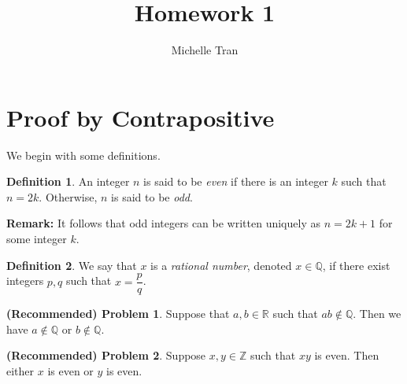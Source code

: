 \documentclass[a4paper,11pt]{article}
\author{Michelle Tran}
\title{Homework 1}
\begin{document}
\maketitle

\newtheorem{prop}{Proposition}[section]
\newtheorem{thm}{Theorem}[section]
\newtheorem{lemma}{Lemma}[section]
\newtheorem{cor}{Corollary}[prop]

\theoremstyle{definition}
\newtheorem{mydef}{Definition}

\theoremstyle{definition}
\newtheorem{required}{(Recommended) Problem}

\theoremstyle{definition}
\newtheorem{advanced}[required]{(Advanced) Problem}

\theoremstyle{definition}
\newtheorem{challenge}[required]{(Challenge) Problem}

\theoremstyle{definition}
\newtheorem{open}{(Open) Problem}

\theoremstyle{definition}
\newtheorem{ex}{Example}


\section{Proof by Contrapositive} 

\noindent We begin with some definitions.

\begin{mydef}
An integer $n$ is said to be \textit{even} if there is an integer $k$ such that $n = 2k$. Otherwise, $n$ is said to be \textit{odd}.
\end{mydef}

\noindent \textbf{Remark:} It follows that odd integers can be written uniquely as $n = 2k+1$ for some integer $k$. 

\noindent
\begin{mydef}
We say that $x$ is a \textit{rational number}, denoted $x \in \mathbb{Q}$, if there exist integers $p, q$ such that $x = \dfrac{p}{q}$.
\end{mydef}


\noindent 
\begin{required}
Suppose that $a, b \in \mathbb{R}$ such that $ab \not \in \mathbb{Q}$. Then we have $a \not \in \mathbb{Q}$ or $b \not \in \mathbb{Q}$.
\end{required}


\begin{required}
Suppose $x, y \in \mathbb{Z}$ such that $xy$ is even. Then either $x$ is even or $y$ is even.
\end{required}
\end{document}
